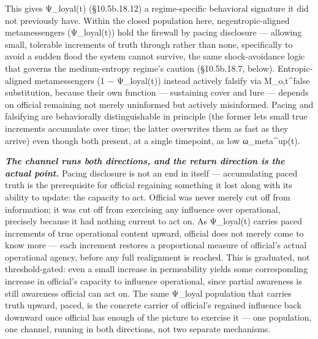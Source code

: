 \documentclass[
]{article}
\begin{document}
This gives Ψ\_loyal(t) (§10.5b.18.12) a regime-specific behavioral
signature it did not previously have. Within the closed population here,
negentropic-aligned metamessengers (Ψ\_loyal(t)) hold the firewall by
pacing disclosure --- allowing small, tolerable increments of truth
through rather than none, specifically to avoid a sudden flood the
system cannot survive, the same shock-avoidance logic that governs the
medium-entropy regime's caution (§10.5b.18.7, below). Entropic-aligned
metamessengers (1 − Ψ\_loyal(t)) instead actively falsify via
M\_o,t\^{}false substitution, because their own function --- sustaining
cover and lure --- depends on official remaining not merely uninformed
but actively misinformed. Pacing and falsifying are behaviorally
distinguishable in principle (the former lets small true increments
accumulate over time; the latter overwrites them as fast as they arrive)
even though both present, at a single timepoint, as low
ω\_meta\^{}up(t).

\emph{\textbf{The channel runs both directions, and the return direction
is the actual point.}} Pacing disclosure is not an end in itself ---
accumulating paced truth is the prerequisite for official regaining
something it lost along with its ability to update: the capacity to act.
Official was never merely cut off from information; it was cut off from
exercising any influence over operational, precisely because it had
nothing current to act on. As Ψ\_loyal(t) carries paced increments of
true operational content upward, official does not merely come to know
more --- each increment restores a proportional measure of official's
actual operational agency, before any full realignment is reached. This
is graduated, not threshold-gated: even a small increase in permeability
yields some corresponding increase in official's capacity to influence
operational, since partial awareness is still awareness official can act
on. The same Ψ\_loyal population that carries truth upward, paced, is
the concrete carrier of official's regained influence back downward once
official has enough of the picture to exercise it --- one population,
one channel, running in both directions, not two separate mechanisms.
\end{document}
